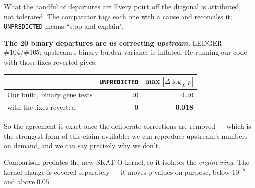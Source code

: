 \documentclass[aspectratio=169,11pt]{beamer}
\newcommand{\win}[1]{\textcolor{good}{\textbf{#1}}}
\begin{document}
\begin{frame}{What the handful of departures are}
Every point off the diagonal is attributed, not tolerated. The comparator tags each
one with a cause and reconciles it; \texttt{UNPREDICTED} means ``stop and explain''.

\medskip
\textbf{The 20 binary departures are \emph{us} correcting \emph{upstream}.}
LEDGER \#104/\#105: upstream's binary burden variance is inflated. Re-running our
code with those fixes reverted gives:

\medskip
\begin{center}\small
\begin{tabular}{lrr}
\toprule
 & \texttt{UNPREDICTED} & max $|\Delta\log_{10}p|$ \\
\midrule
Our build, binary gene tests & 20 & 0.26 \\
\quad with the fixes reverted & \win{0} & \win{0.018} \\
\bottomrule
\end{tabular}
\end{center}

\medskip
So the agreement is exact once the deliberate corrections are removed --- which is
the strongest form of this claim available: we can reproduce upstream's numbers on
demand, and we can say precisely why we don't.

\medskip
{\footnotesize Comparison predates the new SKAT-O kernel, so it isolates the
\emph{engineering}. The kernel change is covered separately --- it moves p-values
on purpose, below $10^{-5}$ and above $0.05$.}
\end{frame}
\end{document}
